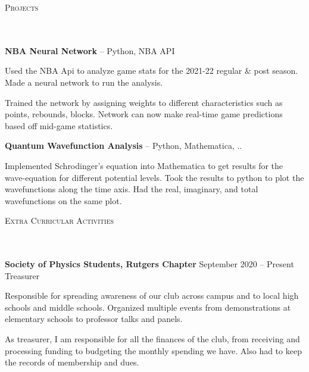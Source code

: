 \documentclass{article}
\newcommand{\header}[1]{{
\hspace*{0pt}\vspace*{6pt} \textsc{#1}} \vspace*{-6pt} 
\lineunder
}
\newcommand{\lineunder}{
\vspace*{-8pt} \\ \hspace*{-3pt} 
\hrulefill \\
}
\newcommand{\employer}[4]{{
\vspace*{2pt}%
\textbf{#1} #2 \hfill #3\\ #4 \vspace*{2pt}}
}
\newcommand{\project}[3]{{
\vspace*{2pt}%
\textbf{#1} #2 \hfill #3\vspace*{2pt}}
}
\renewcommand{\labelitemii}{
$\vcenter{\hbox{\tiny$\bullet$}}$\hspace*{-3pt}
}
\newenvironment{bullet-list-minor}{
\begin{list}{\labelitemii}{\setlength\leftmargin{15pt} 
\topsep 0pt \itemsep -2pt}}{\vspace*{4pt}\end{list}
}
\begin{document}
\vspace*{4pt}%
\header{Projects}
    \project{NBA Neural Network}{-- Python, NBA API}{}
    \begin{bullet-list-minor}
    \item Used the NBA Api to analyze game stats for the 2021-22 regular \& post season. Made a neural network to run the analysis. 
    \item Trained the network by assigning weights to different characteristics such as points, rebounds, blocks. Network can now make real-time game predictions based off mid-game statistics.
    \end{bullet-list-minor}

    \project{Quantum Wavefunction Analysis}{-- Python, Mathematica, ..}{}
	\begin{bullet-list-minor}
	\item Implemented Schrodinger's equation into Mathematica to get results for the wave-equation for different potential levels. Took the results to python to plot the wavefunctions along the time axis. Had the real, imaginary, and total wavefunctions on the same plot.
    \end{bullet-list-minor}


\vspace*{4pt}%
\header{Extra Curricular Activities}
    \employer{Society of Physics Students, Rutgers Chapter}
    {}{September 2020 -- Present}{Treasurer}
	\begin{bullet-list-minor}
    \item Responsible for spreading awareness of our club across campus and to local
high schools and middle schools. Organized multiple events from demonstrations at elementary schools to professor talks and panels. 
    \item As treasurer, I am responsible for all the finances of the club, from receiving and processing funding to budgeting the monthly spending we have. Also had to keep the records of membership and dues.
    \end{bullet-list-minor}
\end{document}
